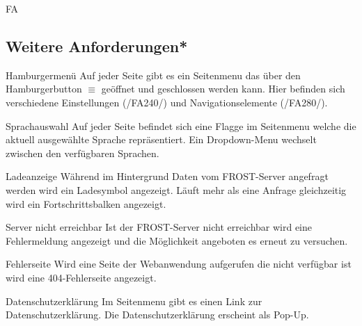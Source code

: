 \begin{Kriterien}{FA}
\subsection{Weitere Anforderungen*}

 \item[Hamburgermenü]
  Auf jeder Seite gibt es ein \gls{Seitenmenu} das über den Hamburgerbutton $\equiv$ geöffnet und geschlossen werden kann.
  Hier befinden sich verschiedene Einstellungen (/FA240/) und Navigationselemente (/FA280/).

 \item[Sprachauswahl]
   Auf jeder Seite befindet sich eine Flagge im \gls{Seitenmenu} welche die aktuell ausgewählte Sprache repräsentiert.
   Ein \gls{Dropdown-Menu} wechselt zwischen den verfügbaren Sprachen.

 \item[Ladeanzeige]
  Während im Hintergrund Daten vom \gls{FROST-Server} angefragt werden wird ein Ladesymbol angezeigt.
  Läuft mehr als eine Anfrage gleichzeitig wird ein Fortschrittsbalken angezeigt.

 \item[Server nicht erreichbar]
  Ist der \gls{FROST-Server} nicht erreichbar wird eine Fehlermeldung angezeigt und die Möglichkeit angeboten es erneut zu versuchen.

 \item[Fehlerseite]
  Wird eine Seite der \gls{Webanwendung} aufgerufen die nicht verfügbar ist wird eine 404-Fehlerseite angezeigt.

 \item[Datenschutzerklärung]
  Im \gls{Seitenmenu} gibt es einen Link zur Datenschutzerklärung.
  Die Datenschutzerklärung erscheint als \gls{Pop-Up}.
\end{Kriterien}
